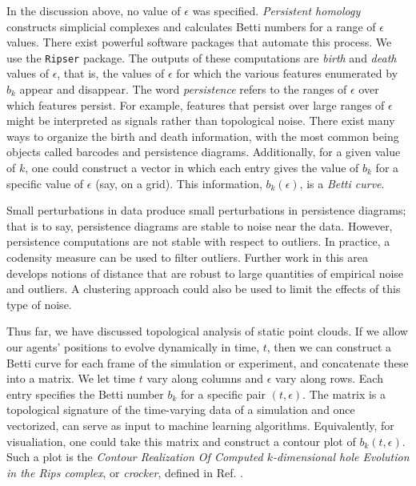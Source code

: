 \documentclass[%
 aip,
reprint,
 amsmath,amssymb,
 aps,
showkeys
]{revtex4-1}
\begin{document}
In the discussion above, no value of $\epsilon$ was specified. \emph{Persistent homology} constructs simplicial complexes and calculates Betti numbers for a range of $\epsilon$ values. There exist powerful software packages that automate this process. \cite{OttPorTil2017} We use the \texttt{Ripser} package. \cite{TraSauBar2018} The outputs of these computations are \emph{birth} and \emph{death} values of $\epsilon$, that is, the values of $\epsilon$ for which the various features enumerated by $b_k$ appear and disappear. The word \emph{persistence} refers to the ranges of $\epsilon$ over which features persist. For example, features that persist over large ranges of $\epsilon$ might be interpreted as signals rather than topological noise. There exist many ways to organize the birth and death information, with the most common being objects called barcodes and persistence diagrams. \cite{OttPorTil2017} 
Additionally, for a given value of $k$, one could construct a vector in which each entry gives the value of $b_k$ for a specific value of $\epsilon$ (say, on a grid). This information, $b_k(\epsilon)$, is a \emph{Betti curve}.

Small perturbations in data produce small perturbations in persistence diagrams; that is to say, persistence diagrams are stable to noise near the data.\cite{Cohen-Steiner2007} However, persistence computations are not stable with respect to outliers. In practice, a codensity measure can be used to filter outliers. Further work in this area develops notions of distance that are robust to large quantities of empirical noise and outliers.\cite{Chazal2011,Fasy2014, Chazal2018} A clustering approach could also be used to limit the effects of this type of noise.\cite{Diky2019}

Thus far, we have discussed topological analysis of static point clouds. If we allow our agents' positions to evolve dynamically in time, $t$, then we can construct a Betti curve for each frame of the simulation or experiment, and concatenate these into a matrix. We let time $t$ vary along columns and $\epsilon$ vary along rows.  Each entry specifies the Betti number $b_k$ for a specific pair $(t,\epsilon)$. The matrix is a topological signature of the time-varying data of a simulation and once vectorized, can serve as input to machine learning algorithms. Equivalently, for visualiation, one could take this matrix and construct a contour plot of $b_k(t,\epsilon)$. Such a plot is the \emph{Contour Realization Of Computed $k$-dimensional hole Evolution in the Rips complex}, or \emph{crocker}, defined in Ref. .
\end{document}
